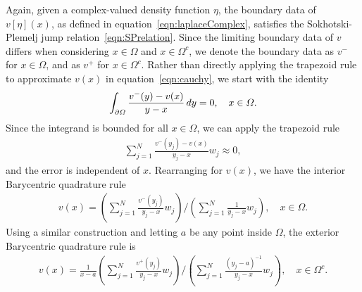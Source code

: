 \documentclass{jfm}
\begin{document}
Again, given a complex-valued density function $\eta$, the boundary data
of $v[\eta](x)$, as defined in equation~\eqref{eqn:laplaceComplex},
satisfies the Sokhotski-Plemelj jump relation~\eqref{eqn:SPrelation}.
Since the limiting boundary data of $v$ differs when considering $x \in
\Omega$ and $x \in \Omega^c$, we denote the boundary data as $v^-$ for
$x \in \Omega$, and as $v^+$ for $x \in \Omega^c$.  Rather than directly
applying the trapezoid rule to approximate $v(x)$ in
equation~\eqref{eqn:cauchy}, we start with the identity
\begin{align}
  \int_{{\partial}\varOmega} \frac{v^{-}(y) - v(x)}{y - x} \,dy = 0,
    \quad x \in \varOmega.
\end{align}
Since the integrand is bounded for all $x \in \Omega$, we can apply the
trapezoid rule
\begin{align}
  \sum_{j=1}^{N} \frac{v^{-}(y_j) - v(x)}{y_j - x} w_j \approx 0,
\end{align}
and the error is independent of $x$.  Rearranging for $v(x)$, we have
the interior Barycentric quadrature rule
\begin{align}
  v(x) = \left(\sum_{j=1}^N \frac{v^{-}(y_j)}{y_j - x} w_j \right)
  \Bigg/
  \left(\sum_{j=1}^N \frac{1}{y_j - x} w_j \right), 
  \quad x \in \Omega.
  \label{eqn:BaryvInterior}
\end{align}
Using a similar construction and letting $a$ be any point inside
$\Omega$, the exterior Barycentric quadrature rule is
\begin{align}
  v(x) = \frac{1}{x-a} 
    \left(\sum_{j=1}^N \frac{v^+(y_j)}{y_j - x}w_j \right)
    \Bigg/
    \left(\sum_{j=1}^N \frac{(y_j - a)^{-1}}{y_j - x}w_j \right),
    \quad x \in \Omega^c.
  \label{eqn:BaryvExterior}
\end{align}
\end{document}
